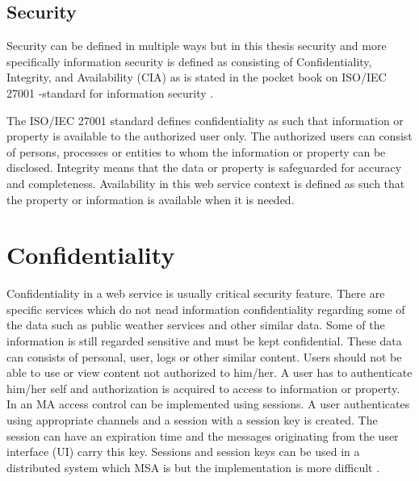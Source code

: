 \subsection{Security}
\begin{sloppypar}
    Security can be defined in multiple ways but in this thesis security 
    and more specifically information security is defined as consisting of 
    Confidentiality, Integrity, and Availability (CIA) as is stated in the 
    pocket book on ISO/IEC 27001 -standard for information security \citep{isoiec27001}.

    The ISO/IEC 27001 standard defines confidentiality as such that information 
    or property is available to the authorized user only. The authorized users 
    can consist of persons, processes or entities to whom the information or 
    property can be disclosed. Integrity means that the data or property is 
    safeguarded for accuracy and completeness. Availability in this web service
    context is defined as such that the property or information is available 
    when it is needed.
    
\end{sloppypar}

\section{Confidentiality}
\begin{sloppypar}

    Confidentiality in a web service is usually critical security feature. 
    There are specific services which do not nead information confidentiality 
    regarding some of the data such as public weather services and other similar data.
    Some of the information is still regarded sensitive and must be kept confidential. 
    These data can consists of personal, user, logs or other similar content.
    Users should not be able to use or view content not authorized to him/her. 
    A user has to authenticate him/her self and authorization is acquired to access to information or property.
    In an MA access control can be implemented using sessions. 
    A user authenticates using appropriate channels and a session with a session key is created. 
    The session can have an expiration time and the messages originating from 
    the user interface (UI) carry this key. Sessions and session keys can be used 
    in a distributed system which MSA is but the implementation is more difficult \citep{authinmsa}.

\end{sloppypar}


